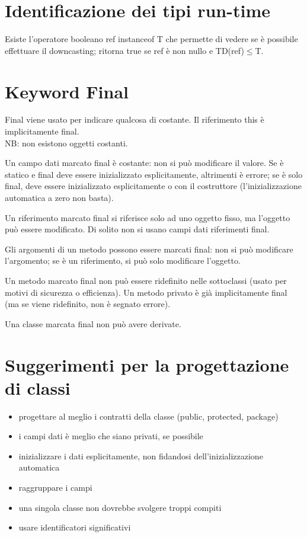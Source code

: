 \section{Identificazione dei tipi run-time}
Esiste l'operatore booleano ref instanceof T che permette di vedere se è possibile effettuare il downcasting; ritorna true se ref è non nullo e TD(ref)$\le$T.

\section{Keyword Final} %
Final viene usato per indicare qualcosa di costante. Il riferimento this è implicitamente final. \\
NB: non esistono oggetti costanti.

Un campo dati marcato final è costante: non si può modificare il valore. Se è  statico e final deve essere inizializzato esplicitamente, altrimenti è errore; se è solo final, deve essere inizializzato esplicitamente o con il costruttore (l'inizializzazione automatica a zero non basta).

Un riferimento marcato final si riferisce solo ad uno oggetto fisso, ma l'oggetto può essere modificato. Di solito non si usano campi dati riferimenti final.

Gli argomenti di un metodo possono essere marcati final: non si può modificare l'argomento; se è un riferimento, si può solo modificare l'oggetto.

Un metodo marcato final non può essere ridefinito nelle sottoclassi (usato per motivi di sicurezza o efficienza). Un metodo privato è già implicitamente final (ma se viene ridefinito, non è segnato errore).

Una classe marcata final non può avere derivate.

\section{Suggerimenti per la progettazione di classi} %
\begin{itemize}
\item progettare al meglio i contratti della classe (public, protected, package)
\item i campi dati è meglio che siano privati, se possibile
\item inizializzare i dati esplicitamente, non fidandosi dell'inizializzazione automatica
\item raggruppare i campi
\item una singola classe non dovrebbe svolgere troppi compiti
\item usare identificatori significativi
\end{itemize}

